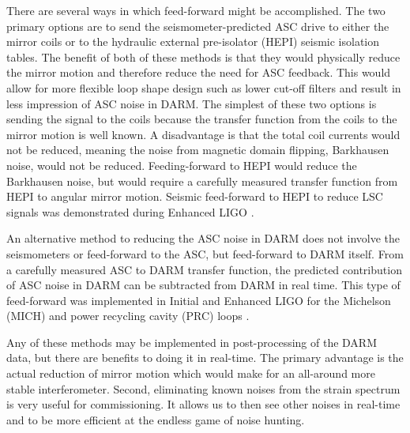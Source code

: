 There are several ways in which feed-forward might be
accomplished. The two primary options are to send the
seismometer-predicted ASC drive to either the mirror coils or to the
hydraulic external pre-isolator (HEPI) seismic isolation tables. The
benefit of both of these methods is that they would physically reduce
the mirror motion and therefore reduce the need for ASC feedback. This
would allow for more flexible loop shape design such as lower cut-off
filters and result in less impression of ASC noise in DARM. The
simplest of these two options is sending the signal to the coils
because the transfer function from the coils to the mirror motion is
well known. A disadvantage is that the total coil currents would not
be reduced, meaning the noise from magnetic domain flipping,
Barkhausen noise, would not be reduced. Feeding-forward to HEPI would
reduce the Barkhausen noise, but would require a carefully measured
transfer function from HEPI to angular mirror motion. Seismic
feed-forward to HEPI to reduce LSC signals was demonstrated during
Enhanced LIGO \cite{DeRosa2011Global}.

An alternative method to reducing the ASC noise in DARM does not
involve the seismometers or feed-forward to the ASC, but feed-forward
to DARM itself. From a carefully measured ASC to DARM transfer
function, the predicted contribution of ASC noise in DARM can be
subtracted from DARM in real time. This type of feed-forward was
implemented in Initial and Enhanced LIGO for the Michelson (MICH) and
power recycling cavity (PRC) loops \cite[Ch. 2]{Ballmer2006LIGO}. 

Any of these methods may be implemented in post-processing of the DARM
data, but there are benefits to doing it in real-time. The primary
advantage is the actual reduction of mirror motion which would make
for an all-around more stable interferometer. Second, eliminating
known noises from the strain spectrum is very useful for
commissioning. It allows us to then see other noises in real-time and
to be more efficient at the endless game of noise hunting.







